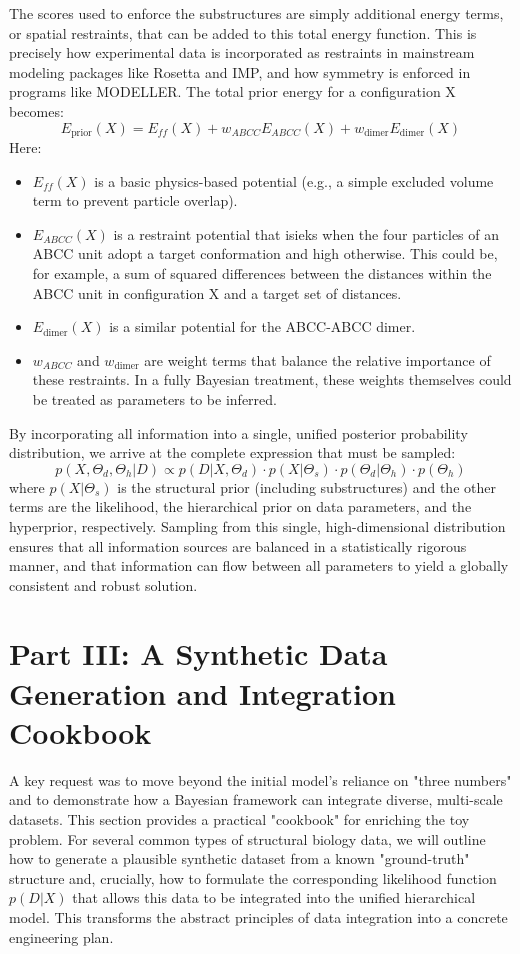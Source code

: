 \documentclass{article}
\begin{document}
The scores used to enforce the substructures are simply additional energy terms, or spatial restraints, that can be added to this total energy function. This is precisely how experimental data is incorporated as restraints in mainstream modeling packages like Rosetta and IMP, and how symmetry is enforced in programs like MODELLER.\cite{ref20} The total prior energy for a configuration X becomes:
\[ E_{\text{prior}}(X) = E_{ff}(X) + w_{ABCC} E_{ABCC}(X) + w_{\text{dimer}} E_{\text{dimer}}(X) \]
Here:
\begin{itemize}
  \item $E_{ff}(X)$ is a basic physics-based potential (e.g., a simple excluded volume term to prevent particle overlap).
  \item $E_{ABCC}(X)$ is a restraint potential that isieks when the four particles of an ABCC unit adopt a target conformation and high otherwise. This could be, for example, a sum of squared differences between the distances within the ABCC unit in configuration X and a target set of distances.
  \item $E_{\text{dimer}}(X)$ is a similar potential for the ABCC-ABCC dimer.
  \item $w_{ABCC}$ and $w_{\text{dimer}}$ are weight terms that balance the relative importance of these restraints. In a fully Bayesian treatment, these weights themselves could be treated as parameters to be inferred.
\end{itemize}

By incorporating all information into a single, unified posterior probability distribution, we arrive at the complete expression that must be sampled:
$$ p(X, \Theta_d, \Theta_h | D) \propto p(D | X, \Theta_d) \cdot p(X | \Theta_s) \cdot p(\Theta_d | \Theta_h) \cdot p(\Theta_h) $$
where $p(X | \Theta_s)$ is the structural prior (including substructures) and the other terms are the likelihood, the hierarchical prior on data parameters, and the hyperprior, respectively. Sampling from this single, high-dimensional distribution ensures that all information sources are balanced in a statistically rigorous manner, and that information can flow between all parameters to yield a globally consistent and robust solution.

\section{Part III: A Synthetic Data Generation and Integration Cookbook}

A key request was to move beyond the initial model's reliance on "three numbers" and to demonstrate how a Bayesian framework can integrate diverse, multi-scale datasets. This section provides a practical "cookbook" for enriching the toy problem. For several common types of structural biology data, we will outline how to generate a plausible synthetic dataset from a known "ground-truth" structure and, crucially, how to formulate the corresponding likelihood function $p(D|X)$ that allows this data to be integrated into the unified hierarchical model. This transforms the abstract principles of data integration into a concrete engineering plan.\cite{ref4}
\end{document}
